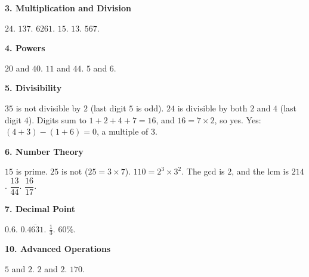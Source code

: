\vspace{0.9em}
\noindent\textbf{3. Multiplication and Division}
\begin{list}{}{\setlength{\leftmargin}{1.5em}\setlength{\itemsep}{0.35em}\setlength{\parsep}{0pt}\setlength{\topsep}{0.4em}}
 $24$.
 $137$.
 $6261$.
 $15$.
 $13$.
 $567$.
\end{list}

\vspace{0.9em}
\noindent\textbf{4. Powers}
\begin{list}{}{\setlength{\leftmargin}{1.5em}\setlength{\itemsep}{0.35em}\setlength{\parsep}{0pt}\setlength{\topsep}{0.4em}}
 $20$ and $40$.
 $11$ and $44$.
 $5$ and $6$.
\end{list}

\vspace{0.9em}
\noindent\textbf{5. Divisibility}
\begin{list}{}{\setlength{\leftmargin}{1.5em}\setlength{\itemsep}{0.35em}\setlength{\parsep}{0pt}\setlength{\topsep}{0.4em}}
 $35$ is not divisible by $2$ (last digit $5$ is odd). $24$ is divisible by both $2$ and $4$ (last digit $4$).
 Digits sum to $1 + 2 + 4 + 7 = 16$, and $16 = 7 \times 2$, so yes.
 Yes: $(4 + 3) - (1 + 6) = 0$, a multiple of $3$.
\end{list}

\vspace{0.9em}
\noindent\textbf{6. Number Theory}
\begin{list}{}{\setlength{\leftmargin}{1.5em}\setlength{\itemsep}{0.35em}\setlength{\parsep}{0pt}\setlength{\topsep}{0.4em}}
 $15$ is prime. $25$ is not ($25 = 3 \times 7$).
 $110 = 2^{3} \times 3^{2}$.
 The gcd is $2$, and the lcm is $214$.
 $\dfrac{13}{44}$.
 $\dfrac{16}{17}$.
\end{list}

\vspace{0.9em}
\noindent\textbf{7. Decimal Point}
\begin{list}{}{\setlength{\leftmargin}{1.5em}\setlength{\itemsep}{0.35em}\setlength{\parsep}{0pt}\setlength{\topsep}{0.4em}}
 $0.6$.
 $0.\overline{4631}$.
 $\frac{1}{3}$.
 $60\%$.
\end{list}

\vspace{0.9em}
\noindent\textbf{10. Advanced Operations}
\begin{list}{}{\setlength{\leftmargin}{1.5em}\setlength{\itemsep}{0.35em}\setlength{\parsep}{0pt}\setlength{\topsep}{0.4em}}
 $5$ and $2$.
 $2$ and $2$.
 $170$.
\end{list}
